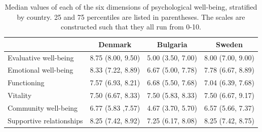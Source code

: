 \documentclass[]{interact}
\makeatletter
\theoremstyle{plain}%
\theoremstyle{definition}
\theoremstyle{remark}
\newcounter{savesection}
\newcounter{apdxsection}
\newcommand\unappendix{\par
  \setcounter{apdxsection}{\value{section}}%
  \setcounter{section}{\value{savesection}}%
  \setcounter{subsection}{0}%
  \gdef\thesection{\@arabic\c@section}}
\makeatother
\begin{document}
\unappendix

\newpage


\setcounter{table}{0}

\begin{table}[H]
\centering
\caption{Median values of each of the six dimensions of psychological well-being, stratified by country. 25 and 75 percentiles are listed in parentheses. The scales are constructed such that they all run from 0-10.} 
\label{tableDistr}

\begin{tabular}{lccc}
\hline
  & Denmark & Bulgaria & Sweden \\
\hline
Evaluative well-being    & 8.75 (8.00, 9.50) & 5.00 (3.50, 7.00) & 8.00 (7.00, 9.00) \\
Emotional well-being     & 8.33 (7.22, 8.89) & 6.67 (5.00, 7.78) & 7.78 (6.67, 8.89) \\
Functioning             & 7.57 (6.93, 8.21) & 6.68 (5.50, 7.68) & 7.04 (6.39, 7.68) \\
Vitality                & 7.50 (6.67, 8.33) & 7.50 (5.83, 8.33) & 7.50 (6.67, 9.17) \\
Community well-being     & 6.77 (5.83 ,7.57) & 4.67 (3.70, 5.70) & 6.57 (5.66, 7.37) \\
Supportive relationships& 8.25 (7.42, 8.92) & 7.25 (6.17, 8.08) & 8.25 (7.42, 8.75) \\
\hline
\end{tabular} 
\end{table}

\newpage
\end{document}
